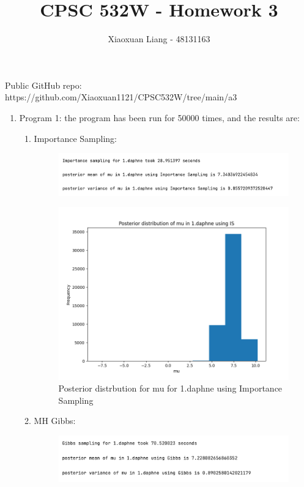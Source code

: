 \documentclass{article}
\title{ \normalfont \normalsize 
\huge CPSC 532W - Homework 3}
\date{}
\author{Xiaoxuan Liang - 48131163}
\begin{document}
\maketitle

Public GitHub repo: https://github.com/Xiaoxuan1121/CPSC532W/tree/main/a3
\begin{enumerate}
\item Program 1: the program has been run for 50000 times,  and the results are:
\begin{enumerate}
\item Importance Sampling:

\begin{figure}[!ht]
	\centering
	\includegraphics[scale=0.6]{../figs/IS/1_program_results}
\end{figure}

\begin{figure}[!ht]
	\centering
	\includegraphics[scale=0.6]{../figs/IS/posterior_histogram_1_daphne}
	\caption{Posterior distrbution for mu for 1.daphne using Importance Sampling}
\end{figure}

\newpage
\item MH Gibbs:

\begin{figure}[!ht]
	\centering
	\includegraphics[scale=0.5]{../figs/Gibbs/1_program_results}
\end{figure}


\end{enumerate}
\end{enumerate}
\end{document}
